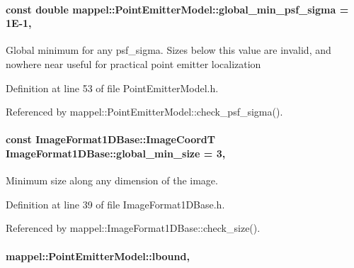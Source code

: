\paragraph[{\texorpdfstring{global\+\_\+min\+\_\+psf\+\_\+sigma}{global_min_psf_sigma}}]{\setlength{\rightskip}{0pt plus 5cm}const double mappel\+::\+Point\+Emitter\+Model\+::global\+\_\+min\+\_\+psf\+\_\+sigma = 1\+E-\/1\hspace{0.3cm}{\ttfamily [static]}, {\ttfamily [inherited]}}\hypertarget{classmappel_1_1PointEmitterModel_a77d0ca98d77cb8b94117ece2a5b182a4}{}\label{classmappel_1_1PointEmitterModel_a77d0ca98d77cb8b94117ece2a5b182a4}
Global minimum for any psf\+\_\+sigma. Sizes below this value are invalid, and nowhere near useful for practical point emitter localization 

Definition at line 53 of file Point\+Emitter\+Model.\+h.



Referenced by mappel\+::\+Point\+Emitter\+Model\+::check\+\_\+psf\+\_\+sigma().

\paragraph[{\texorpdfstring{global\+\_\+min\+\_\+size}{global_min_size}}]{\setlength{\rightskip}{0pt plus 5cm}const {\bf Image\+Format1\+D\+Base\+::\+Image\+CoordT} Image\+Format1\+D\+Base\+::global\+\_\+min\+\_\+size = 3\hspace{0.3cm}{\ttfamily [static]}, {\ttfamily [inherited]}}\hypertarget{classmappel_1_1ImageFormat1DBase_a27c75df8b3d83856d7c2c42ee987af89}{}\label{classmappel_1_1ImageFormat1DBase_a27c75df8b3d83856d7c2c42ee987af89}
Minimum size along any dimension of the image. 

Definition at line 39 of file Image\+Format1\+D\+Base.\+h.



Referenced by mappel\+::\+Image\+Format1\+D\+Base\+::check\+\_\+size().

\paragraph[{\texorpdfstring{lbound}{lbound}}]{ mappel\+::\+Point\+Emitter\+Model\+::lbound\hspace{0.3cm}{\ttfamily [protected]}, {\ttfamily [inherited]}}\hypertarget{classmappel_1_1PointEmitterModel_a889bc82f74cfa654da121e5770296ab2}{}\label{classmappel_1_1PointEmitterModel_a889bc82f74cfa654da121e5770296ab2}


